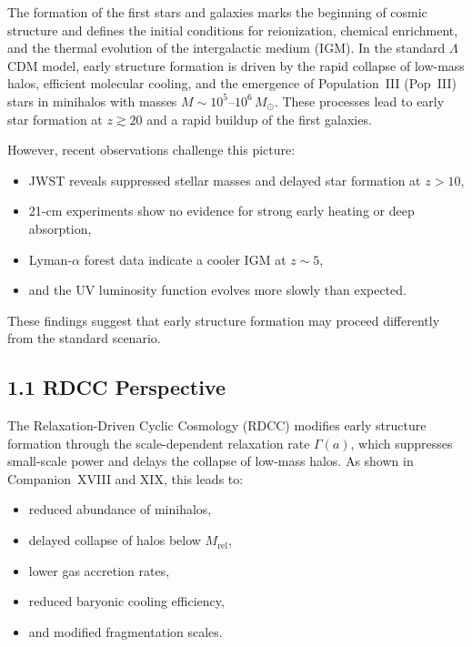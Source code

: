 \documentclass[11pt,a4paper]{article}
\begin{document}
The formation of the first stars and galaxies marks the beginning of cosmic structure and 
defines the initial conditions for reionization, chemical enrichment, and the thermal 
evolution of the intergalactic medium (IGM). In the standard $\Lambda$CDM model, early 
structure formation is driven by the rapid collapse of low-mass halos, efficient molecular 
cooling, and the emergence of Population~III (Pop~III) stars in minihalos with masses 
$M \sim 10^{5}$--$10^{6}\,M_{\odot}$. These processes lead to early star formation at 
$z \gtrsim 20$ and a rapid buildup of the first galaxies.

However, recent observations challenge this picture:

\begin{itemize}
    \item JWST reveals suppressed stellar masses and delayed star formation at $z > 10$,
    \item 21-cm experiments show no evidence for strong early heating or deep absorption,
    \item Lyman-$\alpha$ forest data indicate a cooler IGM at $z \sim 5$,
    \item and the UV luminosity function evolves more slowly than expected.
\end{itemize}

These findings suggest that early structure formation may proceed differently from the 
standard scenario.

\subsection*{1.1 RDCC Perspective}

The Relaxation-Driven Cyclic Cosmology (RDCC) modifies early structure formation through the 
scale-dependent relaxation rate $\Gamma(a)$, which suppresses small-scale power and delays the 
collapse of low-mass halos. As shown in Companion~XVIII and XIX, this leads to:

\begin{itemize}
    \item reduced abundance of minihalos,
    \item delayed collapse of halos below $M_{\mathrm{rel}}$,
    \item lower gas accretion rates,
    \item reduced baryonic cooling efficiency,
    \item and modified fragmentation scales.
\end{itemize}
\end{document}
